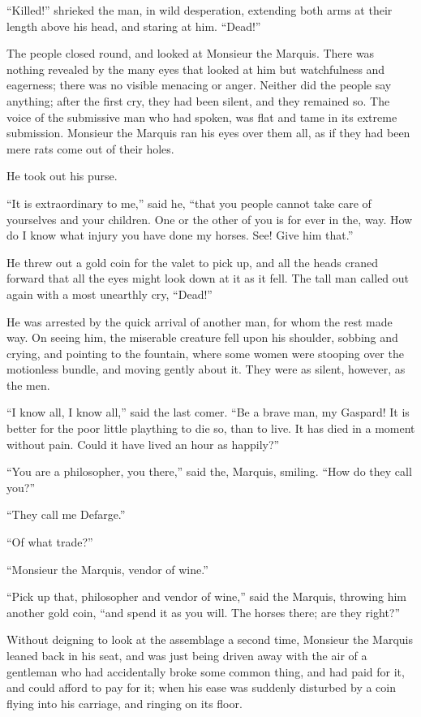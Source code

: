 ``Killed!'' shrieked the man, in wild desperation, extending both arms
at their length above his head, and staring at him.  ``Dead!''

The people closed round, and looked at Monsieur the Marquis.
There was nothing revealed by the many eyes that looked at him but
watchfulness and eagerness; there was no visible menacing or anger.
Neither did the people say anything; after the first cry, they had
been silent, and they remained so.  The voice of the submissive man
who had spoken, was flat and tame in its extreme submission.
Monsieur the Marquis ran his eyes over them all, as if they had been
mere rats come out of their holes.

He took out his purse.

``It is extraordinary to me,'' said he, ``that you people cannot take
care of yourselves and your children.  One or the other of you is for
ever in the, way.  How do I know what injury you have done my horses.
See!  Give him that.''

He threw out a gold coin for the valet to pick up, and all the heads
craned forward that all the eyes might look down at it as it fell.
The tall man called out again with a most unearthly cry, ``Dead!''

He was arrested by the quick arrival of another man, for whom the
rest made way.  On seeing him, the miserable creature fell upon his
shoulder, sobbing and crying, and pointing to the fountain, where
some women were stooping over the motionless bundle, and moving
gently about it.  They were as silent, however, as the men.

``I know all, I know all,'' said the last comer.  ``Be a brave man, my
Gaspard!  It is better for the poor little plaything to die so, than
to live.  It has died in a moment without pain.  Could it have lived
an hour as happily?''

``You are a philosopher, you there,'' said the, Marquis, smiling.
``How do they call you?''

``They call me Defarge.''

``Of what trade?''

``Monsieur the Marquis, vendor of wine.''

``Pick up that, philosopher and vendor of wine,'' said the Marquis,
throwing him another gold coin, ``and spend it as you will.
The horses there; are they right?''

Without deigning to look at the assemblage a second time, Monsieur
the Marquis leaned back in his seat, and was just being driven away
with the air of a gentleman who had accidentally broke some common
thing, and had paid for it, and could afford to pay for it; when his
ease was suddenly disturbed by a coin flying into his carriage,
and ringing on its floor.

